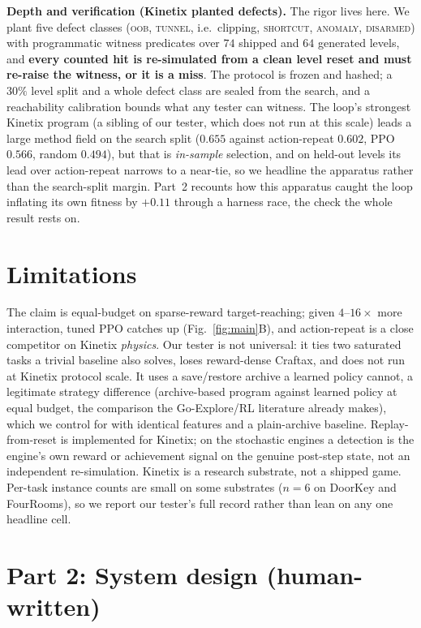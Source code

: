 \documentclass[11pt]{article}
\begin{document}
\textbf{Depth and verification (Kinetix planted defects).} The rigor lives here. We plant five defect classes
(\textsc{oob}, \textsc{tunnel}, i.e.\ clipping, \textsc{shortcut}, \textsc{anomaly}, \textsc{disarmed}) with programmatic
witness predicates over $74$ shipped and $64$ generated levels, and \textbf{every counted hit is re-simulated from a clean
level reset and must re-raise the witness, or it is a miss}. The protocol is frozen and hashed; a $30\%$ level split and a
whole defect class are sealed from the search, and a reachability calibration bounds what any tester can witness. The
loop's strongest Kinetix program (a sibling of our tester, which does not run at this scale) leads a large method field on
the search split ($0.655$ against action-repeat $0.602$, PPO $0.566$, random $0.494$), but that is \emph{in-sample}
selection, and on held-out levels its lead over action-repeat narrows to a near-tie, so we headline the apparatus rather
than the search-split margin. Part~2 recounts how this apparatus caught the loop inflating its own fitness by $+0.11$
through a harness race, the check the whole result rests on.

\section{Limitations}
\label{sec:limits}
The claim is equal-budget on sparse-reward target-reaching; given $4$--$16\times$ more interaction, tuned PPO catches up
(Fig.~\ref{fig:main}B), and action-repeat is a close competitor on Kinetix \emph{physics}. Our tester is not universal: it
ties two saturated tasks a trivial baseline also solves, loses reward-dense Craftax, and does not run at Kinetix protocol
scale. It uses a save/restore archive a learned policy cannot, a legitimate strategy difference (archive-based program
against learned policy at equal budget, the comparison the Go-Explore/RL literature already makes), which we control for
with identical features and a plain-archive baseline. Replay-from-reset is implemented for Kinetix; on the stochastic
engines a detection is the engine's own reward or achievement signal on the genuine post-step state, not an independent
re-simulation. Kinetix is a research substrate, not a shipped game. Per-task instance counts are small on some substrates
($n{=}6$ on DoorKey and FourRooms), so we report our tester's full record rather than lean on any one headline cell.

\section*{Part 2: System design (human-written)}
\end{document}
